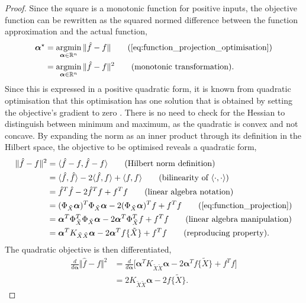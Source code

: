 \documentclass[twoside]{article} \usepackage{aistats2017}
\theoremstyle{definition}
\theoremstyle{theorem}
\newcommand{\argmin}{\operatornamewithlimits{argmin}}
\newcommand{\ds}[1]{\tilde{#1}}
\newcommand{\inner}[2]{{\langle #1, #2 \rangle}}
\begin{document}
		\begin{proof}
			Since the square is a monotonic function for positive inputs, the objective function can be rewritten as the squared normed difference between the function approximation and the actual function,
			\begin{align*}
				\bm{\alpha}^{\star} &= \argmin_{\bm{\alpha} \in \mathbb{R}^{n}} \Vert \hat{f} - f \Vert \tag{\cref{eq:function_projection_optimisation}} \\
				&= \argmin_{\bm{\alpha} \in \mathbb{R}^{n}} \Vert \hat{f} - f \Vert^{2} \tag{monotonic transformation}.
			\end{align*}
			Since this is expressed in a positive quadratic form, it is known from quadratic optimisation that this optimisation has one solution that is obtained by setting the objective's gradient to zero \citep{bertsekas1999nonlinear}. There is no need to check for the Hessian to distinguish between minimum and maximum, as the quadratic is convex and not concave. By expanding the norm as an inner product through its definition in the Hilbert space, the objective to be optimised reveals a quadratic form,
			\begin{align*}
				\Vert \hat{f} - f \Vert^{2} &= \langle \hat{f} - f, \hat{f} - f \rangle \tag{Hilbert norm definition} \\
				&= \langle \hat{f}, \hat{f} \rangle - 2 \langle \hat{f}, f \rangle + \langle f, f \rangle \tag{bilinearity of $\inner{\cdot}{\cdot}$} \\
				&=  \hat{f}^{T} \hat{f} - 2 \hat{f}^{T} f + f^{T} f \tag{linear algebra notation} \\
				&= (\Phi_{\ds{X}} \bm{\alpha})^{T} \Phi_{\ds{X}}  \bm{\alpha} - 2 (\Phi_{\ds{X}}  \bm{\alpha})^{T} f + f^{T} f \tag{\cref{eq:function_projection}} \\
				&= \bm{\alpha}^{T} \Phi_{\ds{X}} ^{T} \Phi_{\ds{X}}  \bm{\alpha} - 2 \bm{\alpha}^{T} \Phi_{\ds{X}} ^{T} f + f^{T} f \tag{linear algebra manipulation}\\
				&= \bm{\alpha}^{T} K_{\ds{X} \ds{X}}  \bm{\alpha} - 2 \bm{\alpha}^{T} f\{\ds{X}\} + f^{T} f \tag{reproducing property}.
			\end{align*}
			The quadratic objective is then differentiated,
			\begin{align*}
				\frac{d}{d \bm{\alpha}} \Vert \hat{f} - f \Vert^{2} &= \frac{d}{d \bm{\alpha}} 
				\bigg[ \bm{\alpha}^{T} K_{\ds{X} \ds{X}}  \bm{\alpha} - 2 \bm{\alpha}^{T} f\{\ds{X}\} + f^{T} f \bigg]\\
				&= 2 K_{\ds{X} \ds{X}}  \bm{\alpha} - 2 f\{\ds{X}\}.

\end{align*}
\end{proof}
\end{document}
